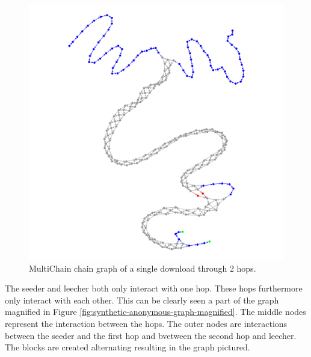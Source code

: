 \begin{figure}
	\centerline{\includegraphics[scale=0.1]{experimentation/synthetic/anonymous/anonymous.png}}
	\caption{MultiChain chain graph of a single download through 2 hops.}
	\label{fig:synthetic-anonymous-graph}
\end{figure}

The seeder and leecher both only interact with one hop.
These hops furthermore only interact with each other.
This can be clearly seen a part of the graph magnified in Figure \ref{fig:synthetic-anonymous-graph-magnified}.
The middle nodes represent the interaction between the hops.
The outer nodes are interactions between the seeder and the first hop and bvetween the second hop and leecher.
The blocks are created alternating resulting in the graph pictured.

